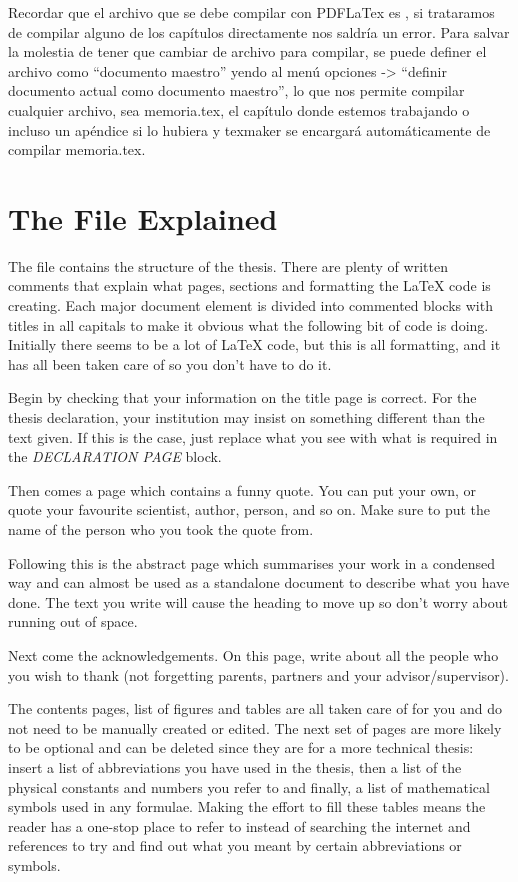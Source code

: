 Recordar que el archivo que se debe compilar con PDFLaTex es , si trataramos de compilar alguno de los capítulos directamente nos saldría un error.  Para salvar la molestia de tener que cambiar de archivo para compilar, se puede definer el archivo  como ``documento maestro'' yendo al menú opciones -> ``definir documento actual como documento maestro'', lo que nos permite compilar cualquier archivo, sea memoria.tex, el capítulo donde estemos trabajando o incluso un apéndice si lo hubiera y texmaker se encargará automáticamente de compilar memoria.tex.


\section{The  File Explained}

The  file contains the structure of the thesis. There are plenty of written comments that explain what pages, sections and formatting the \LaTeX{} code is creating. Each major document element is divided into commented blocks with titles in all capitals to make it obvious what the following bit of code is doing. Initially there seems to be a lot of \LaTeX{} code, but this is all formatting, and it has all been taken care of so you don't have to do it.

Begin by checking that your information on the title page is correct. For the thesis declaration, your institution may insist on something different than the text given. If this is the case, just replace what you see with what is required in the \emph{DECLARATION PAGE} block.

Then comes a page which contains a funny quote. You can put your own, or quote your favourite scientist, author, person, and so on. Make sure to put the name of the person who you took the quote from.

Following this is the abstract page which summarises your work in a condensed way and can almost be used as a standalone document to describe what you have done. The text you write will cause the heading to move up so don't worry about running out of space.

Next come the acknowledgements. On this page, write about all the people who you wish to thank (not forgetting parents, partners and your advisor/supervisor).

The contents pages, list of figures and tables are all taken care of for you and do not need to be manually created or edited. The next set of pages are more likely to be optional and can be deleted since they are for a more technical thesis: insert a list of abbreviations you have used in the thesis, then a list of the physical constants and numbers you refer to and finally, a list of mathematical symbols used in any formulae. Making the effort to fill these tables means the reader has a one-stop place to refer to instead of searching the internet and references to try and find out what you meant by certain abbreviations or symbols.

